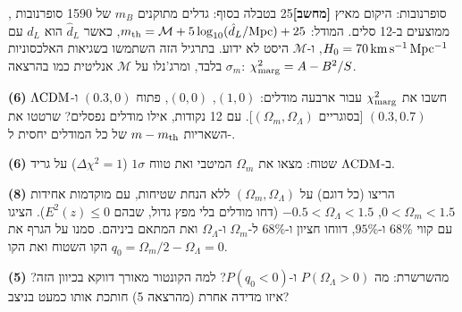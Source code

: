 \documentclass[11pt,a4paper]{article}
\begin{document}
\begin{question}{סופרנובות: היקום מאיץ \textbf{[מחשב]}}{25}
בטבלה בסוף: גדלים מתוקנים $m_B$ של 1590 סופרנובות , ממוצעים ב-12 סלים. המודל:
$m_{\rm th}=\mathcal M+5\log_{10}(\hat d_L/\mathrm{Mpc})+25$, כאשר $\hat d_L$ הוא $d_L$ עם $H_0=70\,\mathrm{km\,s^{-1}\,Mpc^{-1}}$, ו-$\mathcal M$ היסט לא ידוע. בתרגיל הזה השתמשו בשגיאות האלכסוניות $\sigma_m$ בלבד, ומרג'נלו על $\mathcal M$ אנליטית כמו בהרצאה: $\chi^2_{\rm marg}=A-B^2/S$.
\begin{parts}
\item \textbf{(6)} חשבו את $\chi^2_{\rm marg}$ עבור ארבעה מודלים:  $(1,0)$,  $(0,0)$, פתוח $(0.3,0)$ ו-$\Lambda\mathrm{CDM}$ $(0.3,0.7)$ [בסוגריים $(\Omega_m,\Omega_\Lambda)$]. עם 12 נקודות, אילו מודלים נפסלים? שרטטו את השאריות $m-m_{\rm th}$ של כל המודלים יחסית ל-.
\item \textbf{(6)} ב-$\Lambda\mathrm{CDM}$ שטוח: מצאו את $\Omega_m$ המיטבי ואת טווח $1\sigma$ ($\Delta\chi^2=1$) על גריד.
\item \textbf{(8)} הריצו  (כל דוגם) על $(\Omega_m,\Omega_\Lambda)$ ללא הנחת שטיחות, עם מוקדמות אחידות $0<\Omega_m<1.5$, $-0.5<\Omega_\Lambda<1.5$ (דחו מודלים בלי מפץ גדול, שבהם $E^2(z)\le0$). הציגו  עם קווי $68\%$ ו-$95\%$, דווחו חציון ו-$68\%$ ל-$\Omega_m$ ו-$\Omega_\Lambda$ ואת המתאם ביניהם. סמנו על הגרף את הקו השטוח ואת הקו $q_0=\Omega_m/2-\Omega_\Lambda=0$.
\item \textbf{(5)} מהשרשרת: מה $P(\Omega_\Lambda>0)$ ו-$P(q_0<0)$? למה הקונטור מאורך דווקא בכיוון הזה? איזו מדידה אחרת (מהרצאה 5) חותכת אותו כמעט בניצב?
\end{parts}
\end{question}
\end{document}
